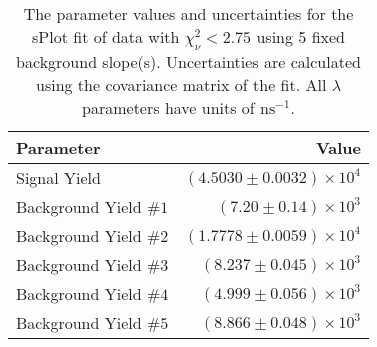 
\begin{table}
    \begin{center}
        \begin{tabular}{lr}\toprule
            Parameter & Value \\\midrule
            Signal Yield & $(4.5030 \pm 0.0032) \times 10^{4}$ \\
            Background Yield $\#1$ & $(7.20 \pm 0.14) \times 10^{3}$ \\
            Background Yield $\#2$ & $(1.7778 \pm 0.0059) \times 10^{4}$ \\
            Background Yield $\#3$ & $(8.237 \pm 0.045) \times 10^{3}$ \\
            Background Yield $\#4$ & $(4.999 \pm 0.056) \times 10^{3}$ \\
            Background Yield $\#5$ & $(8.866 \pm 0.048) \times 10^{3}$ \\\bottomrule
        \end{tabular}
        \caption{The parameter values and uncertainties for the sPlot fit of data with $\chi^2_\nu < 2.75$ using 5 fixed background slope(s). Uncertainties are calculated using the covariance matrix of the fit. All $\lambda$ parameters have units of $\si{\nano\second}^{-1}$.}
    \end{center}
\end{table}
